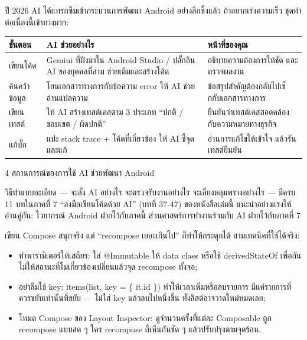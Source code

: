 
ปี 2026 AI ได้แทรกซึมเข้ากระบวนการพัฒนา Android อย่างลึกซึ้งแล้ว ถ้าอยากเร่งความเร็ว ชุดท่าต่อเนื่องนี้เข้าทางมาก:

\begin{center}
\begin{tabularx}{\linewidth}{|X|X|X|}
\hline
\textbf{ขั้นตอน} & \textbf{AI ช่วยอย่างไร} & \textbf{หน้าที่ของคุณ} \tabularnewline
\hline
เขียนโค้ด & Gemini ที่ฝังมาใน Android Studio / ปลั๊กอิน AI ของบุคคลที่สาม ช่วยเติมและสร้างโค้ด & อธิบายความต้องการให้ชัด และตรวจผลงาน \tabularnewline
ค้นคว้าข้อมูล & โยนเอกสารทางการกับข้อความ error ให้ AI ช่วยอ่านแปลความ & ข้อสรุปสำคัญต้องกลับไปเช็กกับเอกสารทางการ \tabularnewline
เขียนเทสต์ & ให้ AI สร้างเทสต์เคสตาม 3 ประเภท “ปกติ / ขอบเขต / ผิดปกติ” & ยืนยันว่าเทสต์เคสสอดคล้องกับความหมายทางธุรกิจ \tabularnewline
แก้บั๊ก & แปะ stack trace + โค้ดที่เกี่ยวข้อง ให้ AI ชี้จุดและแก้ & อ่านการแก้ไขให้เข้าใจ แล้วรันเทสต์ยืนยัน \tabularnewline
\hline
\end{tabularx}
\end{center}

\begin{center}\small\color{gray}4 สถานการณ์ของการใช้ AI ช่วยพัฒนา Android\end{center}

วิธีทำแบบละเอียด — จะสั่ง AI อย่างไร จะตรวจรับงานอย่างไร จะเลี่ยงหลุมพรางอย่างไร — มีครบ 11 บทในภาคที่ 7 “ลงมือเขียนโค้ดด้วย AI” (บทที่ 37-47) ของหนังสือเล่มนี้ แนะนำอย่างแรงให้อ่านคู่กัน: ไวยากรณ์ Android ฝากไว้กับภาคนี้ ส่วนศาสตร์การทำงานร่วมกับ AI ฝากไว้กับภาคที่ 7


เขียน Compose สนุกจริง แต่ “recompose เยอะเกินไป” ก็ทำให้กระตุกได้ สามเทคนิคที่ใช้ได้จริง:

\begin{itemize}
  \item ทำพารามิเตอร์ให้เสถียร: ใส่ @Immutable ให้ data class หรือใช้ derivedStateOf เพื่อกันไม่ให้สถานะที่ไม่เกี่ยวข้องเปลี่ยนแล้วจุด recompose ทั้งจอ;
  \item อย่าลืมใช้ key: items(list, key = \{ it.id \}) ทำให้เวลาเพิ่มหรือลบรายการ มีแค่รายการที่ควรขยับเท่านั้นที่ขยับ — ไม่ใส่ key แล้วลบไปหนึ่งชิ้น ทั้งลิสต์อาจวาดใหม่หมดเลย;
  \item โหมด Compose ของ Layout Inspector: ดูจำนวนครั้งที่แต่ละ Composable ถูก recompose แบบสด ๆ ใคร recompose ถี่เห็นกันชัด ๆ แล้วปรับปรุงตามจุดร้อน.
\end{itemize}

